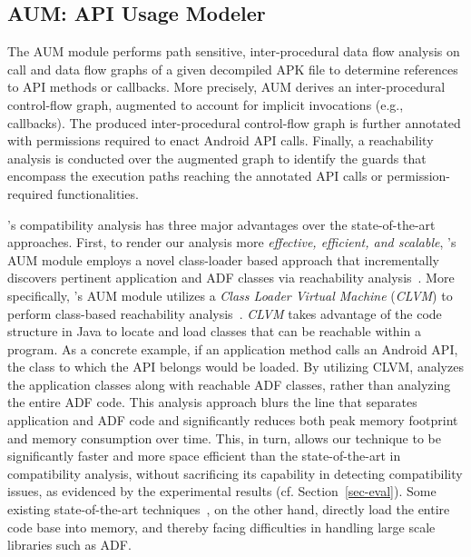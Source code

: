 \subsection{AUM: API Usage Modeler}
\label{API Usage Extraction}

The AUM module performs path sensitive, inter-procedural
data flow analysis on call and data flow graphs of a given
decompiled APK file to determine references to API methods
or callbacks.  More precisely, AUM derives an
inter-procedural control-flow graph, augmented to account
for implicit invocations (e.g., callbacks). The produced inter-procedural
control-flow graph is further annotated with permissions
required to enact Android API calls. Finally, a reachability
analysis is conducted over the augmented graph to identify
the guards that encompass the execution paths reaching the
annotated API calls or permission-required functionalities. 

\@approach's compatibility analysis has three major
advantages over the state-of-the-art approaches.
First,  to render our analysis more \emph{effective,
efficient, and scalable}, \@approach's AUM module
employs a novel class-loader based approach that incrementally discovers
pertinent application and ADF classes via reachability
analysis~\cite{tsutano2017efficient}.  
More specifically, \@approach's AUM module utilizes a \emph{Class Loader
Virtual Machine} (\emph{CLVM}) to perform class-based
reachability analysis~\cite{tsutano2017efficient}.
\emph{CLVM} takes advantage of the code structure in Java
to locate and load classes that can be reachable within
a program.  As a concrete example, if an application method
calls an Android API, the class to which the API
belongs would be loaded.  By utilizing CLVM, \@approach analyzes the application classes along with reachable ADF classes, rather than analyzing the entire ADF code. This analysis approach
blurs the line that separates application and ADF code and
significantly reduces both peak memory footprint and
memory consumption over time.
This, in turn, allows our technique
to be significantly faster and more space efficient
than the state-of-the-art in compatibility analysis,
without sacrificing its capability in detecting
compatibility issues, as evidenced by the experimental
results (cf.  Section~\ref{sec-eval}).  
Some existing
state-of-the-art
techniques~\cite{huang2018understanding,he2018understanding},
on the other hand, directly load the entire code base
into memory, and thereby facing difficulties in
handling large scale libraries such as ADF. 

